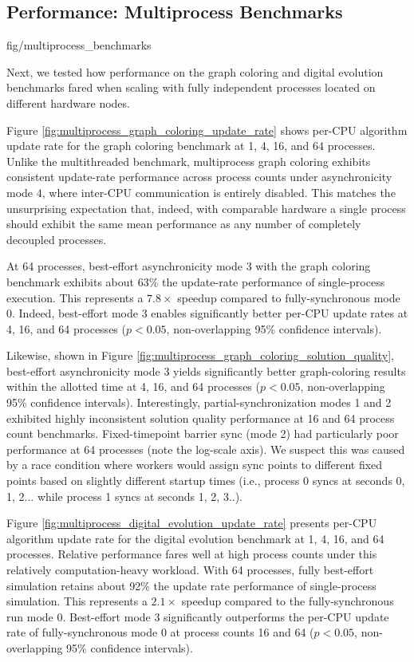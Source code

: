 \subsection{Performance: Multiprocess Benchmarks}
\label{sec:multiprocess-benchmarks}

{fig/multiprocess_benchmarks}

Next, we tested how performance on the graph coloring and digital evolution benchmarks fared when scaling with fully independent processes located on different hardware nodes.

Figure \ref{fig:multiprocess_graph_coloring_update_rate} shows per-CPU algorithm update rate for the graph coloring benchmark at 1, 4, 16, and 64 processes.
Unlike the multithreaded benchmark, multiprocess graph coloring exhibits consistent update-rate performance across process counts under asynchronicity mode 4, where inter-CPU communication is entirely disabled.
This matches the unsurprising expectation that, indeed, with comparable hardware a single process should exhibit the same mean performance as any number of completely decoupled processes.

At 64 processes, best-effort asynchronicity mode 3 with the graph coloring benchmark exhibits about 63\% the update-rate performance of single-process execution.
This represents a $7.8\times$ speedup compared to fully-synchronous mode 0.
Indeed, best-effort mode 3 enables significantly better per-CPU update rates at 4, 16, and 64 processes ($p < 0.05$, non-overlapping 95\% confidence intervals).

Likewise, shown in Figure \ref{fig:multiprocess_graph_coloring_solution_quality}, best-effort asynchronicity mode 3 yields significantly better graph-coloring results within the allotted time at 4, 16, and 64 processes ($p < 0.05$, non-overlapping 95\% confidence intervals).
Interestingly, partial-synchronization modes 1 and 2 exhibited highly inconsistent solution quality performance at 16 and 64 process count benchmarks.
Fixed-timepoint barrier sync (mode 2) had particularly poor performance at 64 processes (note the log-scale axis).
We suspect this was caused by a race condition where workers would assign sync points to different fixed points based on slightly different startup times (i.e., process 0 syncs at seconds 0, 1, 2... while process 1 syncs at seconds 1, 2, 3..).

Figure \ref{fig:multiprocess_digital_evolution_update_rate} presents per-CPU algorithm update rate for the digital evolution benchmark at 1, 4, 16, and 64 processes.
Relative performance fares well at high process counts under this relatively computation-heavy workload.
With 64 processes, fully best-effort simulation retains about 92\% the update rate performance of single-process simulation.
This represents a $2.1\times$ speedup compared to the fully-synchronous run mode 0.
Best-effort mode 3 significantly outperforms the per-CPU update rate of fully-synchronous mode 0 at process counts 16 and 64 ($p < 0.05$, non-overlapping 95\% confidence intervals).
